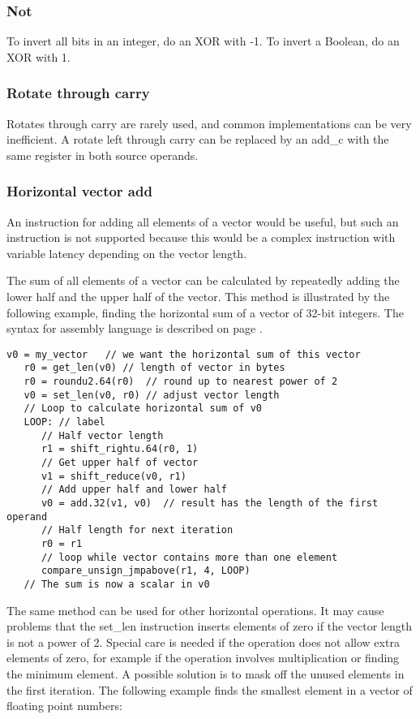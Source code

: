 \documentclass[forwardcom.tex]{subfiles}
\begin{document}
\subsubsection{Not}
To invert all bits in an integer, do an XOR with -1. To invert a Boolean, do an XOR with 1.

\subsubsection{Rotate through carry}
Rotates through carry are rarely used, and common implementations can be very inefficient. A rotate left through carry can be replaced by an add\_c with the same register in both source operands.

\subsubsection{Horizontal vector add} \label{horizontalVectorAdd}
An instruction for adding all elements of a vector would be useful, but such an instruction is not supported because this would be a complex instruction with variable latency depending on the vector length.
\vspace{2mm}

The sum of all elements of a vector can be calculated by repeatedly adding the lower half and the upper half of the vector. This method is illustrated by the following example, finding the horizontal sum of a vector of 32-bit integers. The syntax for assembly language is described on page \pageref{assemblySyntax}.

\begin{lstlisting}[frame=none]
   v0 = my_vector   // we want the horizontal sum of this vector
   r0 = get_len(v0) // length of vector in bytes
   r0 = roundu2.64(r0)  // round up to nearest power of 2
   v0 = set_len(v0, r0) // adjust vector length
   // Loop to calculate horizontal sum of v0
   LOOP: // label
      // Half vector length
      r1 = shift_rightu.64(r0, 1)
      // Get upper half of vector
      v1 = shift_reduce(v0, r1)
      // Add upper half and lower half
      v0 = add.32(v1, v0)  // result has the length of the first operand
      // Half length for next iteration
      r0 = r1
      // loop while vector contains more than one element
      compare_unsign_jmpabove(r1, 4, LOOP)      
   // The sum is now a scalar in v0
\end{lstlisting}

The same method can be used for other horizontal operations. It may cause problems that the set\_len instruction inserts elements of zero if the vector length is not a power of 2. Special care is needed if the operation does not allow extra elements of zero, for example if the operation involves multiplication or finding the minimum element. A possible solution is to mask off the unused elements in the first iteration. The following example finds the smallest element in a vector of floating point numbers:
\end{document}
